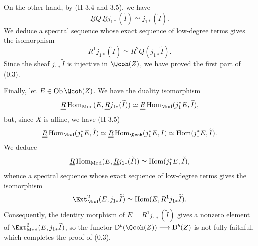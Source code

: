 On the other hand, by (II 3.4 and 3.5), we have
\[
 \underline{\underline{R}}Q\,\underline{\underline{R}}j_{1*}(\widetilde I)\simeq j_{1*}(\widetilde I).
\]
We deduce a spectral sequence whose exact sequence of low-degree terms gives the isomorphism
\[
 R^1j_{1*}(\widetilde I)\simeq R^2Q(j_{1*}\widetilde I).
\]
Since the sheaf $j_{1*}\widetilde I$ is injective in $\Qcoh(Z)$, we have proved the first
%
part of (0.3).

Finally, let $E\in\Ob\Qcoh(Z)$. We have the duality isomorphism
\[
 \underline{\underline{R}}\Hom_{\Mod}(E,\underline{\underline{R}}j_{1*}(\widetilde I))
 \simeq \underline{\underline{R}}\Hom_{\Mod}(j_1^*E,\widetilde I),
\]
but, since $X$ is affine, we have (II 3.5)
\[
 \underline{\underline{R}}\Hom_{\Mod}(j_1^*E,\widetilde I)
 \simeq \underline{\underline{R}}\Hom_{\Qcoh}(j_1^*E,I)
 \simeq \Hom(j_1^*E,\widetilde I).
\]
We deduce
\[
 \underline{\underline{R}}\Hom_{\Mod}(E,\underline{\underline{R}}j_{1*}(\widetilde I))
 \simeq \Hom(j_1^*E,\widetilde I),
\]
whence a spectral sequence whose exact sequence of low-degree terms gives the isomorphism
\[
 \Ext^2_{\Mod}(E,j_{1*}\widetilde I)
 \simeq \Hom(E,R^1j_{1*}\widetilde I).
\]
Consequently, the identity morphism of $E=R^1j_{1*}(\widetilde I)$ gives a nonzero element of $\Ext^2_{\Mod}(E,j_{1*}\widetilde I)$, so the functor $\mathrm D^b(\Qcoh(Z))\longrightarrow \mathrm D^b(Z)$ is not fully faithful, which completes the proof of (0.3).

\providecommand{\Diff}{\operatorname{Diff}}
\providecommand{\Hom}{\operatorname{Hom}}
\providecommand{\im}{\operatorname{Im}}
\providecommand{\ind}{\operatorname{ind}}
\providecommand{\Cone}{\operatorname{Cone}}
\providecommand{\Loclib}{\operatorname{Loclib}}
\providecommand{\ob}{\operatorname{ob}}
\providecommand{\Parf}{\operatorname{Parf}}
\providecommand{\Mod}{\operatorname{Mod}}
\providecommand{\Ob}{\operatorname{Ob}}
\providecommand{\Coker}{\operatorname{Coker}}
\providecommand{\Ker}{\operatorname{Ker}}
\providecommand{\cH}{\mathcal H}
\providecommand{\cO}{\mathcal O}
\providecommand{\cP}{\mathcal P}
\providecommand{\cE}{\mathcal E}
\providecommand{\cF}{\mathcal F}
\providecommand{\cG}{\mathcal G}
\providecommand{\cD}{\mathcal D}
\providecommand{\cT}{\mathcal T}
\providecommand{\cL}{\mathcal L}
\providecommand{\RHom}{\mathrm R\!\operatorname{Hom}}
\providecommand{\RGamma}{\mathrm R\Gamma}
\providecommand{\dlim}{\operatorname*{lim}}
\providecommand{\plim}{\operatorname*{lim}}

